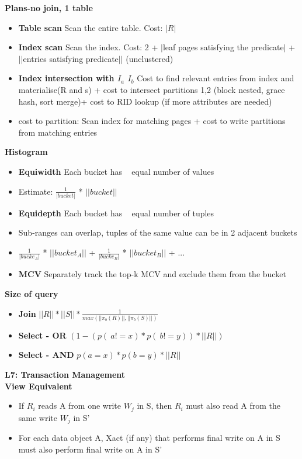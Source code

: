 \documentclass[10pt, landscape]{article}
\begin{document}
\begin{multicols}{4}
\textbf{Plans-no join, 1 table} \\
\begin{itemize}
  \item \textbf{Table scan} Scan the entire table. Cost: $|R|$
  \item \textbf{Index scan} Scan the index. Cost: 2 + $|$leaf pages satisfying the predicate$|$ + $||$entries satisfying predicate$||$ (unclustered)
  \item \textbf{Index intersection with $I_a$ $I_b$} Cost to find relevant entries from index and materialise(R and s) + cost to intersect partitions 1,2 (block nested, grace hash, sort merge)+ cost to RID lookup (if more attributes are needed)
  \item cost to partition: Scan index for matching pages + cost to write partitions from matching entries
\end{itemize}


\textbf{Histogram} \\ 
\begin{itemize}
  \item \textbf{Equiwidth} Each bucket has ~ equal number of values
  \item Estimate: $\frac{1}{|bucket|}$ * $||bucket||$
  \item \textbf{Equidepth} Each bucket has ~ equal number of tuples
  \item Sub-ranges can overlap, tuples of the same value can be in 2 adjacent buckets
  \item $\frac{1}{|bucke_A|}$ * $||bucket_A||$ + $\frac{1}{|bucke_B|}$ * $||bucket_B||$ + ...
  \item \textbf{MCV} Separately track the top-k MCV and exclude them from the bucket
\end{itemize}

\textbf{Size of query}  \\
\begin{itemize}
  \item \textbf{Join} $||R||*||S||* \frac{1}{max(||\pi_b(R)||,||\pi_b(S)||)}$
  \item \textbf{Select - OR} $(1-(p(~a!=x)*p(~b!=y))*||R||)$
  \item \textbf{Select - AND} $p(a=x)*p(b=y)*||R||$
\end{itemize}

\textbf{\large{L7: Transaction Management}} \\
\textbf{View Equivalent} \\
\begin{itemize}
  \item If $R_i$ reads A from one write $W_j$ in S, then $R_i$ must also read A from the same write $W_j$ in S'
  \item For each data object A, Xact (if any) that performs final write on A in S must also perform final write on A in S'
\end{itemize}


\end{multicols}
\end{document}
